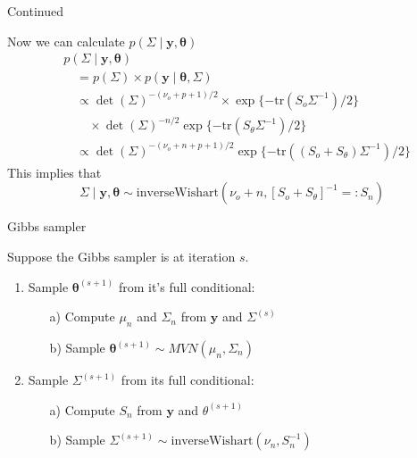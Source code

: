 \documentclass[
  ignorenonframetext,
]{beamer}
\newcommand{\btheta}{{\bm\theta}}
\begin{document}
\begin{frame}{Continued}
\protect\hypertarget{continued-1}{}

Now we can calculate \(p(\Sigma \mid \bm{y}, \btheta)\) \begin{align}
&p(\Sigma \mid \bm{y},  \btheta) \\ & \quad= p(\Sigma) \times p(\bm{y} \mid \btheta, \Sigma) \\
& \quad \propto 
\det(\Sigma)^{-(\nu_o + p +1)/2} \times \exp\{
-\text{tr}(S_o\Sigma^{-1})/2
\} \\
& \qquad \times
\det(\Sigma)^{-n/2}\exp\{-
\text{tr}(S_\theta \Sigma^{-1})/2\}\\
& \quad \propto 
\det(\Sigma)^{-(\nu_o + n + p +1)/2}
\exp\{-
\text{tr}((S_o +S_\theta) \Sigma^{-1})/2\}
\end{align} This implies that
\[\Sigma \mid \bm{y}, \btheta \sim \text{inverseWishart}(\nu_o + n, [S_o + S_\theta]^{-1} =: S_n)\]

\end{frame}


\begin{frame}{Gibbs sampler}
\protect\hypertarget{gibbs-sampler}{}

Suppose the Gibbs sampler is at iteration \(s.\)

\begin{enumerate}
\item Sample $\btheta^{(s+1)}$ from it's full conditional:
\begin{enumerate}
\item[a)] Compute $\mu_n$ and $\Sigma_n$ from $\bm{y}$ and $\Sigma^{(s)}$
\item[b)] Sample $\btheta^{(s+1)}\sim MVN(\mu_n, \Sigma_n)$
\end{enumerate}
\item Sample $\Sigma^{(s+1)}$ from its full conditional:
\begin{enumerate}
\item[a)] Compute $S_n$ from $\bm{y}$ and $\theta^{(s+1)}$
\item[b)] Sample $\Sigma^{(s+1)} \sim \text{inverseWishart}(\nu_n, S_n^{-1})$
\end{enumerate}
\end{enumerate}

\end{frame}
\end{document}
